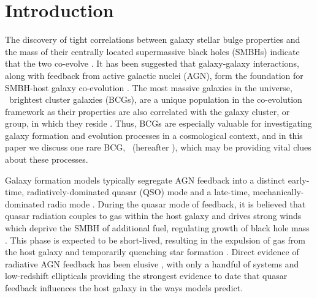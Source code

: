 \documentclass[useAMS,usenatbib]{mn2e}
\begin{document}
\section{Introduction}
\label{sec:intro}

The discovery of tight correlations between galaxy stellar bulge
properties and the mass of their centrally located supermassive black
holes (SMBHs) indicate that the two co-evolve
\citep[\eg][]{1995ARA&A..33..581K, magorrian, 2000ApJ...539L...9F,
  2000ApJ...539L..13G, 2001ApJ...563L..11G}. It has been suggested
that galaxy-galaxy interactions, along with feedback from active
galactic nuclei (AGN), form the foundation for SMBH-host galaxy
co-evolution \citep[\eg][]{1995MNRAS.276..663B, 1998A&A...331L...1S,
  2000MNRAS.311..576K, 2001MNRAS.324..757G}. The most massive galaxies
in the universe, \eg\ brightest cluster galaxies (BCGs), are a unique
population in the co-evolution framework as their properties are also
correlated with the galaxy cluster, or group, in which they reside
\citep[\eg][]{1984ApJ...276...38J, 1998ApJ...502..141D}. Thus, BCGs
are especially valuable for investigating galaxy formation and
evolution processes in a cosmological context, and in this paper we
discuss one rare BCG, \inine\ (hereafter \irs), which may be providing
vital clues about these processes.

Galaxy formation models typically segregate AGN feedback into a
distinct early-time, radiatively-dominated quasar (QSO) mode
\citep[\eg][]{2005Natur.435..629S, 2006ApJS..163....1H} and a
late-time, mechanically-dominated radio mode \citep[\eg][]{croton06,
  bower06}. During the quasar mode of feedback, it is believed that
quasar radiation couples to gas within the host galaxy and drives
strong winds which deprive the SMBH of additional fuel, regulating
growth of black hole mass \citep[\eg][]{2005ApJ...630..705H,
  2005Natur.433..604D}. This phase is expected to be short-lived,
resulting in the expulsion of gas from the host galaxy and temporarily
quenching star formation \citep[\eg][]{2006ApJ...642L.107N,
  2008ApJ...686..219M}. Direct evidence of radiative AGN feedback has
been elusive \citep[see][for a review]{2005ARA&A..43..769V}, with only
a handful of systems \citep[\eg][]{2008A&A...492...81P,
  2010A&A...518L.155F} and low-redshift ellipticals
\citep{2009ApJ...690.1672S} providing the strongest evidence to date
that quasar feedback influences the host galaxy in the ways models
predict.
\end{document}
